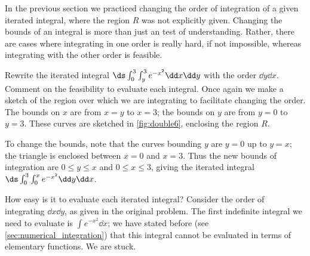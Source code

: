 In the previous section we practiced changing the order of integration of a given iterated integral, where the region $R$ was not explicitly given. Changing the bounds of an integral is more than just an test of understanding. Rather, there are cases where integrating in one order is really hard, if not impossible, whereas integrating with the other order is feasible.

\begin{example}\label{ex_double6}
Rewrite the iterated integral $\ds \int_0^3\int_y^3 e^{-x^2}\dd x\dd y$ with the order $\dd y\dd x$. Comment on the feasibility to evaluate each integral.
\solution
Once again we make a sketch of the region over which we are integrating to facilitate changing the order. The bounds on $x$ are from $x=y$ to $x=3$; the bounds on $y$ are from $y=0$ to $y=3$. These curves are sketched in \autoref{fig:double6}, enclosing the region $R$.


To change the bounds, note that the curves bounding $y$ are $y=0$ up to $y=x$; the triangle is enclosed between $x=0$ and $x=3$. Thus the new bounds of integration are $0\leq y\leq x$ and $0\leq x\leq 3$, giving the iterated integral $\ds \int_0^3\int_0^x e^{-x^2}\dd y\dd x$.

How easy is it to evaluate each iterated integral? Consider the order of integrating $\dd x\dd y$, as given in the original problem. The first indefinite integral we need to evaluate is $\int e^{-x^2}\dd x$; we have stated before (see \autoref{sec:numerical_integration}) that this integral cannot be evaluated in terms of elementary functions. We are stuck.


\end{example}
